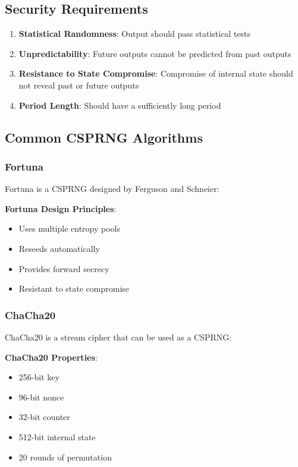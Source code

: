 \documentclass[11pt,a4paper]{article}
\begin{document}
\subsection{Security Requirements}

\begin{enumerate}
    \item \textbf{Statistical Randomness}: Output should pass statistical tests
    \item \textbf{Unpredictability}: Future outputs cannot be predicted from past outputs
    \item \textbf{Resistance to State Compromise}: Compromise of internal state should not reveal past or future outputs
    \item \textbf{Period Length}: Should have a sufficiently long period
\end{enumerate}

\subsection{Common CSPRNG Algorithms}

\subsubsection{Fortuna}

Fortuna is a CSPRNG designed by Ferguson and Schneier:

\begin{mathbox}
\textbf{Fortuna Design Principles}:
\begin{itemize}
    \item Uses multiple entropy pools
    \item Reseeds automatically
    \item Provides forward secrecy
    \item Resistant to state compromise
\end{itemize}
\end{mathbox}

\subsubsection{ChaCha20}

ChaCha20 is a stream cipher that can be used as a CSPRNG:

\begin{mathbox}
\textbf{ChaCha20 Properties}:
\begin{itemize}
    \item 256-bit key
    \item 96-bit nonce
    \item 32-bit counter
    \item 512-bit internal state
    \item 20 rounds of permutation
\end{itemize}
\end{mathbox}
\end{document}
